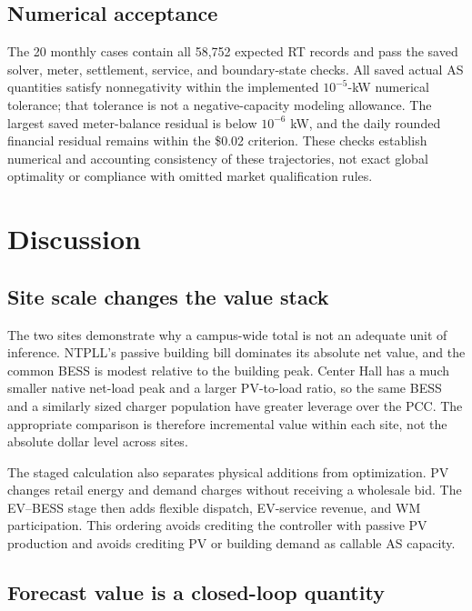 \documentclass[final,5p,times]{elsarticle}
\begin{document}
\clearpage
\subsection{Numerical acceptance}
\label{sec:site_validation_results}

The 20 monthly cases contain all 58,752 expected RT records and pass the
saved solver, meter, settlement, service, and boundary-state checks. All saved actual AS quantities satisfy nonnegativity within the implemented $10^{-5}$-kW numerical tolerance; that tolerance is not a negative-capacity modeling allowance. The largest
saved meter-balance residual is below $10^{-6}$ kW, and the daily rounded
financial residual remains within the \$0.02 criterion. These checks establish
numerical and accounting consistency of these trajectories, not exact
global optimality or compliance with omitted market qualification rules.

\section{Discussion}
\label{sec:discussion}

\subsection{Site scale changes the value stack}

The two sites demonstrate why a campus-wide total is not an adequate unit of
inference. NTPLL's passive building bill dominates its absolute net value, and
the common BESS is modest relative to the building peak. Center Hall has a much
smaller native net-load peak and a larger PV-to-load ratio, so the same BESS and
a similarly sized charger population have greater leverage over the PCC. The
appropriate comparison is therefore incremental value within each site, not
the absolute dollar level across sites.

The staged calculation also separates physical additions from optimization.
PV changes retail energy and demand charges without receiving a wholesale bid.
The EV--BESS stage then adds flexible dispatch, EV-service revenue, and WM
participation. This ordering avoids crediting the controller with passive PV
production and avoids crediting PV or building demand as callable AS capacity.

\subsection{Forecast value is a closed-loop quantity}
\end{document}
